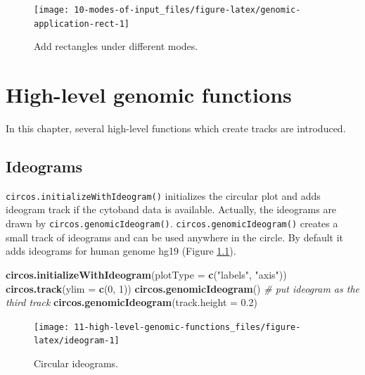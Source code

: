 \documentclass[]{book}
\newenvironment{Shaded}{\begin{snugshade}}{\end{snugshade}}
\newcommand{\KeywordTok}[1]{\textcolor[rgb]{0.13,0.29,0.53}{\textbf{#1}}}
\newcommand{\DataTypeTok}[1]{\textcolor[rgb]{0.13,0.29,0.53}{#1}}
\newcommand{\DecValTok}[1]{\textcolor[rgb]{0.00,0.00,0.81}{#1}}
\newcommand{\FloatTok}[1]{\textcolor[rgb]{0.00,0.00,0.81}{#1}}
\newcommand{\StringTok}[1]{\textcolor[rgb]{0.31,0.60,0.02}{#1}}
\newcommand{\CommentTok}[1]{\textcolor[rgb]{0.56,0.35,0.01}{\textit{#1}}}
\newcommand{\NormalTok}[1]{#1}
\theoremstyle{definition}
\theoremstyle{definition}
\theoremstyle{remark}
\begin{document}
\begin{figure}

{\centering \texttt{[image: 10-modes-of-input\_files/figure-latex/genomic-application-rect-1]} 

}

\caption{Add rectangles under different modes.}\label{fig:genomic-application-rect}
\end{figure}

\chapter{High-level genomic
functions}\label{high-level-genomic-functions}

In this chapter, several high-level functions which create tracks are
introduced.

\section{Ideograms}\label{ideograms}

\texttt{circos.initializeWithIdeogram()} initializes the circular plot
and adds ideogram track if the cytoband data is available. Actually, the
ideograms are drawn by \texttt{circos.genomicIdeogram()}.
\texttt{circos.genomicIdeogram()} creates a small track of ideograms and
can be used anywhere in the circle. By default it adds ideograms for
human genome hg19 (Figure \ref{fig:ideogram}).

\begin{Shaded}
\begin{Highlighting}[]
\KeywordTok{circos.initializeWithIdeogram}\NormalTok{(}\DataTypeTok{plotType =} \KeywordTok{c}\NormalTok{(}\StringTok{"labels"}\NormalTok{, }\StringTok{"axis"}\NormalTok{))}
\KeywordTok{circos.track}\NormalTok{(}\DataTypeTok{ylim =} \KeywordTok{c}\NormalTok{(}\DecValTok{0}\NormalTok{, }\DecValTok{1}\NormalTok{))}
\KeywordTok{circos.genomicIdeogram}\NormalTok{() }\CommentTok{# put ideogram as the third track}
\KeywordTok{circos.genomicIdeogram}\NormalTok{(}\DataTypeTok{track.height =} \FloatTok{0.2}\NormalTok{)}
\end{Highlighting}
\end{Shaded}

\begin{figure}

{\centering \texttt{[image: 11-high-level-genomic-functions\_files/figure-latex/ideogram-1]} 

}

\caption{Circular ideograms.}\label{fig:ideogram}
\end{figure}
\end{document}
